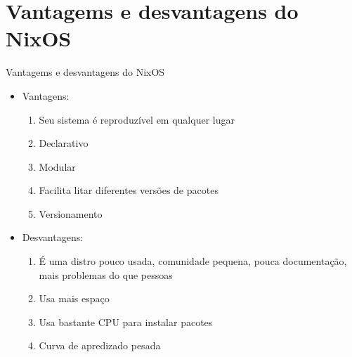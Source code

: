 \documentclass[presentation]{beamer}
\begin{document}
\section{Vantagems e desvantagens do NixOS}
\label{sec:org7757f4a}
\begin{frame}[label={sec:orgd0d84f1}]{Vantagems e desvantagens do NixOS}
\begin{itemize}
\item Vantagens:
\begin{enumerate}
\item Seu sistema é reproduzível em qualquer lugar
\item Declarativo
\item Modular
\item Facilita litar diferentes versões de pacotes
\item Versionamento
\end{enumerate}
\item Desvantagens:
\begin{enumerate}
\item É uma distro pouco usada, comunidade pequena, pouca documentação, mais problemas do que pessoas
\item Usa mais espaço
\item Usa bastante CPU para instalar pacotes
\item Curva de apredizado pesada
\end{enumerate}
\end{itemize}
\end{frame}
\end{document}

